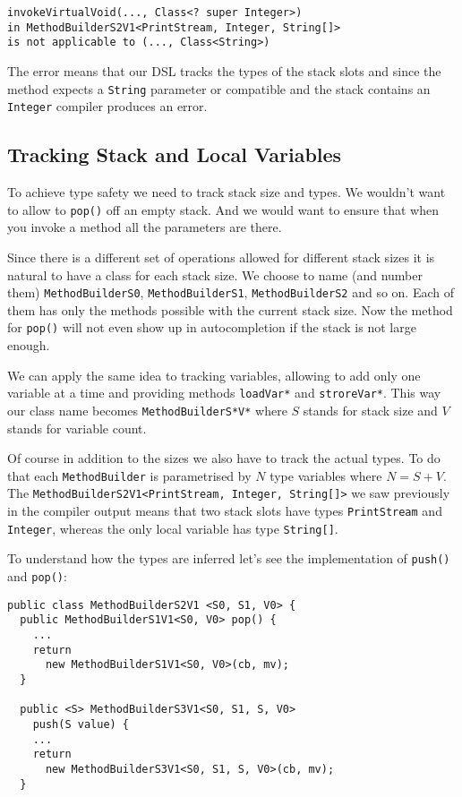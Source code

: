 \documentclass{sig-alternate}
\begin{document}
\begin{verbatim}
invokeVirtualVoid(..., Class<? super Integer>) 
in MethodBuilderS2V1<PrintStream, Integer, String[]>
is not applicable to (..., Class<String>)
\end{verbatim}

The error means that our DSL tracks the types of the stack slots and since the method expects a \verb!String! parameter or compatible and the stack contains an \verb!Integer! compiler produces an error. 

\subsection{Tracking Stack and Local Variables}

To achieve type safety we need to track stack size and types. We wouldn't want to allow to \verb!pop()! off an empty stack. And we would want to ensure that when you invoke a method all the parameters are there. 

Since there is a different set of operations allowed for different stack sizes it is natural to have a class for each stack size. We choose to name (and number them) \verb!MethodBuilderS0!, \verb!MethodBuilderS1!, \verb!MethodBuilderS2! and so on. Each of them has only the methods possible with the current stack size. Now the method for \verb!pop()! will not even show up in autocompletion if the stack is not large enough.

We can apply the same idea to tracking variables, allowing to add only one variable at a time and providing methods \verb!loadVar*! and \verb!stroreVar*!. This way our class name becomes \verb!MethodBuilderS*V*! where $S$ stands for stack size and $V$ stands for variable count.

Of course in addition to the sizes we also have to track the actual types. To do that each \verb!MethodBuilder! is parametrised by $N$ type variables where $N = S + V$. The \verb!MethodBuilderS2V1<PrintStream, Integer, String[]>! we saw previously in the compiler output means that two stack slots have types \verb!PrintStream! and \verb!Integer!, whereas the only local variable has type \verb!String[]!.

To understand how the types are inferred let's see the implementation of \verb!push()! and \verb!pop()!:

\begin{verbatim}
public class MethodBuilderS2V1 <S0, S1, V0> {
  public MethodBuilderS1V1<S0, V0> pop() {
    ...
    return 
      new MethodBuilderS1V1<S0, V0>(cb, mv);
  }

  public <S> MethodBuilderS3V1<S0, S1, S, V0> 
    push(S value) {
    ...
    return 
      new MethodBuilderS3V1<S0, S1, S, V0>(cb, mv);
  }
\end{verbatim}
\end{document}
